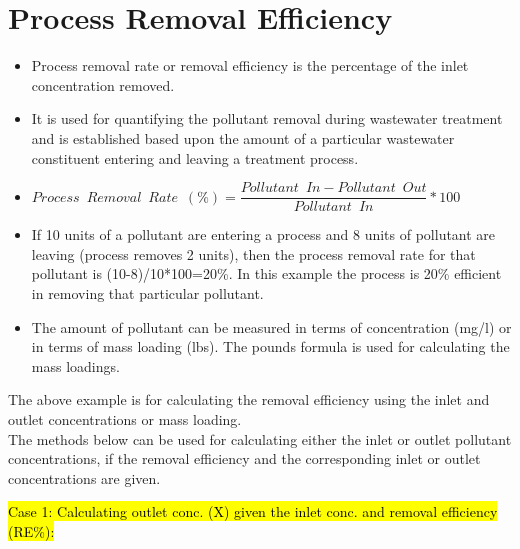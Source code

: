 \section{Process Removal Efficiency}

\begin{itemize}
\item Process removal rate or removal efficiency is the percentage of the inlet concentration removed.  
\item It is used for quantifying the pollutant removal during wastewater treatment and is established based upon the amount of a particular wastewater constituent entering and leaving a treatment process.

\item $Process \enspace Removal \enspace Rate \enspace (\%) = \dfrac{Pollutant \enspace  In-Pollutant\enspace  Out}{Pollutant \enspace In}*100$\\

\item If 10 units of a pollutant are entering a process and 8 units of pollutant are leaving (process removes 2 units), then the process removal rate for that pollutant is (10-8)/10*100=20\%.  In this example the process is 20\% efficient in removing that particular pollutant.

\item The amount of pollutant can be measured in terms of concentration (mg/l) or in terms of mass loading (lbs).  The pounds formula is used for calculating the mass loadings.  
\end{itemize}
The above example is for calculating the removal efficiency using the inlet and outlet concentrations or mass loading.\\
The methods below can be used for calculating either the inlet or outlet pollutant concentrations, if the removal efficiency and the corresponding inlet or outlet concentrations are given. 


\hl{Case 1:  Calculating outlet conc. (X) given the inlet conc. and removal efficiency (RE\%):}


